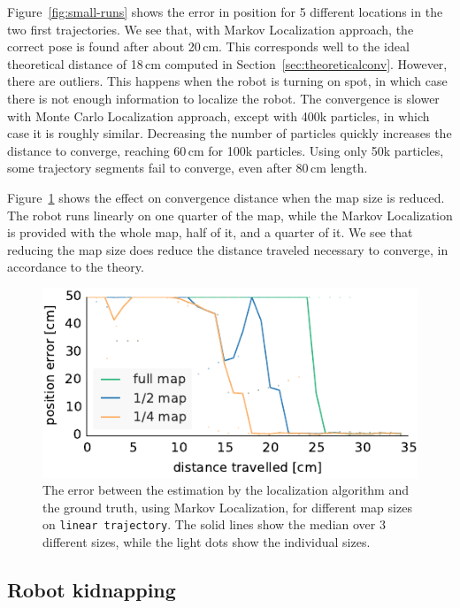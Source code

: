 \documentclass[letterpaper, 10pt, conference]{ieeeconf}
\newcommand{\Fig}[1]{Figure~\ref{fig:#1}}
\newcommand{\sect}[1]{Section~\ref{sec:#1}}
\begin{document}
\Fig{small-runs} shows the error in position for 5 different locations in the two first trajectories.
We see that, with Markov Localization approach, the correct pose is found after about 20\,cm.
This corresponds well to the ideal theoretical distance of 18\,cm computed in \sect{theoreticalconv}.
However, there are outliers.
This happens when the robot is turning on spot, in which case there is not enough information to localize the robot.
The convergence is slower with Monte Carlo Localization approach, except with 400k particles, in which case it is roughly similar.
Decreasing the number of particles quickly increases the distance to converge, reaching 60\,cm for 100k particles.
Using only 50k particles, some trajectory segments fail to converge, even after 80\,cm length.

\Fig{small-maps} shows the effect on convergence distance when the map size is reduced.
The robot runs linearly on one quarter of the map, while the Markov Localization is provided with the whole map, half of it, and a quarter of it.
We see that reducing the map size does reduce the distance traveled necessary to converge, in accordance to the theory.

\begin{figure}
\includegraphics{ml-small_maps-xy}
\caption{The error between the estimation by the localization algorithm and the ground truth, using Markov Localization, for different map sizes on \texttt{linear trajectory}.
The solid lines show the median over 3 different sizes, while the light dots show the individual sizes.}
\label{fig:small-maps}
\end{figure}

\subsection{Robot kidnapping}
\end{document}
